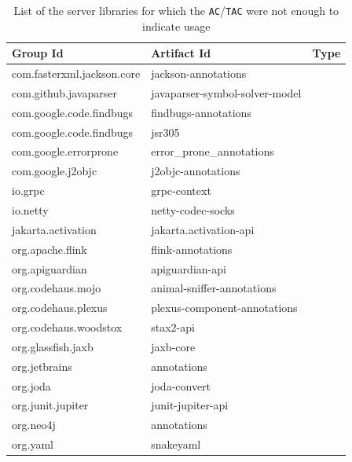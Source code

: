 \begin{table}[ht]
\begin{center}
\begin{tabular}{|l|l|l|}
\hline
\textbf{Group Id} & \textbf{Artifact Id} & \textbf{Type} \\
\hline
com.fasterxml.jackson.core  & jackson-annotations             & \\\hline
com.github.javaparser       & javaparser-symbol-solver-model  & \\\hline
com.google.code.findbugs    & findbugs-annotations            & \\\hline
com.google.code.findbugs    & jsr305                          & \\\hline
com.google.errorprone       & error\_prone\_annotations       & \\\hline
com.google.j2objc           & j2objc-annotations              & \\\hline
io.grpc                     & grpc-context                    & \\\hline
io.netty                    & netty-codec-socks               & \\\hline
jakarta.activation          & jakarta.activation-api          & \\\hline
org.apache.flink            & flink-annotations               & \\\hline
org.apiguardian             & apiguardian-api                 & \\\hline
org.codehaus.mojo           & animal-sniffer-annotations      & \\\hline
org.codehaus.plexus         & plexus-component-annotations    & \\\hline
org.codehaus.woodstox       & stax2-api                       & \\\hline
org.glassfish.jaxb          & jaxb-core                       & \\\hline
org.jetbrains               & annotations                     & \\\hline
org.joda                    & joda-convert                    & \\\hline
org.junit.jupiter           & junit-jupiter-api               & \\\hline
org.neo4j                   & annotations                     & \\\hline
org.yaml                    & snakeyaml                       & \\\hline
\end{tabular}
\end{center}
\caption{List of the server libraries for which the \texttt{AC}/\texttt{TAC} were not enough to indicate usage}
\label{table:significance-ac}
\end{table}

